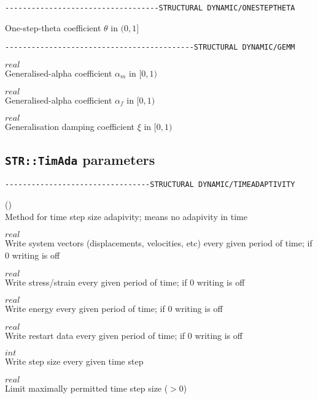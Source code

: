 \begin{verbatim}
-----------------------------------STRUCTURAL DYNAMIC/ONESTEPTHETA
\end{verbatim}

One-step-theta coefficient $\theta$ in $(0,1]$

\begin{verbatim}
-------------------------------------------STRUCTURAL DYNAMIC/GEMM
\end{verbatim}

 $real$\\
Generalised-alpha coefficient $\alpha_m$ in $[0,1)$

 $real$\\
Generalised-alpha coefficient $\alpha_f$ in $[0,1)$

 $real$\\
Generalisation damping coefficient $\xi$ in $[0,1)$

\subsection{\baci{} \texttt{STR::TimAda} parameters}

\begin{verbatim}
---------------------------------STRUCTURAL DYNAMIC/TIMEADAPTIVITY
\end{verbatim}

 (\kor{}\kor{})\\
Method for time step size adapivity;  means no adapivity in time

 $real$\\
Write system vectors (displacements, velocities, etc) every given period of time; if $0$ writing is off

 $real$\\
Write stress/strain every given period of time; if $0$ writing is off

 $real$\\
Write energy every given period of time; if $0$ writing is off

 $real$\\
Write restart data every given period of time; if $0$ writing is off

 $int$\\
Write step size every given time step

 $real$\\
Limit maximally permitted time step size ($>0$)

